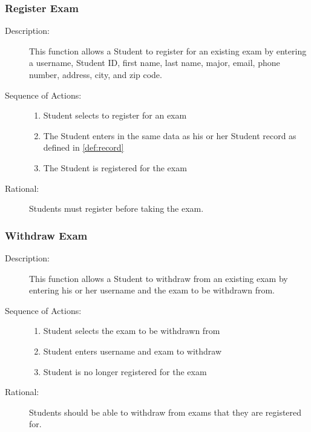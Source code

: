 \subsubsection{\large Register Exam} 
\begin{boxed} %
      \begin{description}
         \item[Description:\label{desc:register_exam}]
   This function allows a Student to register for an existing exam by entering a
   username, Student ID, first name, last name, major, email, phone number,
   address, city, and zip code.
         
            \item[Sequence of Actions:]\hspace{10cm}
         \begin{enumerate}
            \item Student selects to register for an exam
            \item The Student enters in the same data as his or her Student
               record as defined in \ref{def:record}
            \item The Student is registered for the exam
         \end{enumerate}

            \item[Rational:]
               Students must register before taking the exam.
      \end{description}
   \end{boxed} %

   \subsubsection{\large Withdraw Exam} 
   \begin{boxed} %
      \begin{description}
         \item[Description:\label{desc:withdraw_exam}]
      This function allows a Student to withdraw from an existing exam by
      entering his or her username and the exam to be withdrawn from.
         
            \item[Sequence of Actions:]\hspace{10cm}
         \begin{enumerate}
            \item Student selects the exam to be withdrawn from
            \item Student enters username and exam to withdraw
            \item Student is no longer registered for the exam
         \end{enumerate}

            \item[Rational:]
               Students should be able to withdraw from exams that they are
               registered for.
      \end{description}
   \end{boxed} %

